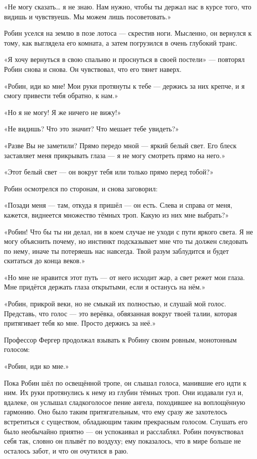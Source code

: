 \documentclass[a5paper, 9pt,
final, openany, twoside=true]{memoir}
\begin{document}
«Не могу сказать… я не знаю. Нам нужно, чтобы ты держал нас в курсе того, что видишь и чувствуешь. Мы можем лишь посоветовать.»

Робин уселся на землю в позе лотоса — скрестив ноги. Мысленно, он вернулся к тому, как выглядела его комната, а затем погрузился в очень глубокий транс.

«Я хочу вернуться в свою спальню и проснуться в своей постели» — повторял Робин снова и снова. Он чувствовал, что его тянет наверх.

«Робин, иди ко мне! Мои руки протянуты к тебе — держись за них крепче, и я смогу привести тебя обратно, к нам.»

«Но я не могу! Я же ничего не вижу!»

«Не видишь? Что это значит? Что мешает тебе увидеть?»

«Разве Вы не заметили? Прямо передо мной — яркий белый свет. Его блеск заставляет меня прикрывать глаза — я не могу смотреть прямо на него.»

«Этот белый свет — он вокруг тебя или только прямо перед тобой?»

Робин осмотрелся по сторонам, и снова заговорил:

«Позади меня — там, откуда я пришёл — он есть. Слева и справа от меня, кажется, виднеется множество тёмных троп. Какую из них мне выбрать?»

«Робин! Что бы ты ни делал, ни в коем случае не уходи с пути яркого света. Я не могу объяснить почему, но инстинкт подсказывает мне что ты должен следовать по нему, иначе ты потеряешь нас навсегда. Твой разум заблудится и будет скитаться до конца веков.»

«Но мне не нравится этот путь — от него исходит жар, а свет режет мои глаза. Мне придётся держать глаза открытыми, если я останусь на нём.»

«Робин, прикрой веки, но не смыкай их полностью, и слушай мой голос. Представь, что голос — это верёвка, обвязанная вокруг твоей талии, которая притягивает тебя ко мне. Просто держись за неё.»

Профессор Фергер продолжал взывать к Робину своим ровным, монотонным голосом:

«Робин, иди ко мне.»

Пока Робин шёл по освещённой тропе, он слышал голоса, манившие его идти к ним. Их руки протянулись к нему из глубин тёмных троп. Они издавали гул и, вдалеке, он услышал сладкоголосое пение ангела, походившее на воплощённую гармонию. Оно было таким притягательным, что ему сразу же захотелось встретиться с существом, обладающим таким прекрасным голосом. Слушать его было необычайно приятно — он успокаивал и расслаблял. Робин почувствовал себя так, словно он плывёт по воздуху; ему показалось, что в мире больше не осталось забот, и что он очутился в раю.
\end{document}
